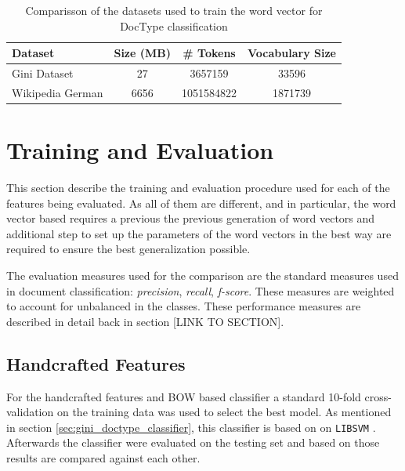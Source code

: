 \begin{table}[h]

  \centering
  \caption{Comparisson of the datasets used to train the word vector for
    \ac{DocType} classification}
  \label{tab:w2v4tc_dataset_comparisson}

\small
\begin{tabular}{|l|c|c|c|}
\hline
Dataset           &  Size (MB)  &    \# Tokens  &  Vocabulary  Size  \\
\hline
 Gini Dataset      &         27  &     3657159  &             33596  \\
 Wikipedia German  &       6656  &  1051584822  &           1871739  \\
\hline
\end{tabular}

\end{table}


\section{Training and Evaluation}
\label{sec:w2v4tc_training-evaluation}

This section describe the training and evaluation procedure used for each of
the features being evaluated. As all of them are different, and in
particular, the word vector based requires a previous the previous generation
of word vectors and additional step to set up the parameters of the word
vectors in the best way are required to ensure the best generalization
possible.

The evaluation measures used for the comparison  are the standard measures used in document
classification: \textit{precision}, \textit{recall}, \textit{f-score}. These
measures are  weighted to account for unbalanced in the classes. These
performance measures are described in detail back in section [LINK TO SECTION].


\subsection{Handcrafted Features}

For the handcrafted features and \ac{BOW} based classifier a standard 10-fold
cross-validation  on the training data  was used to select the best model.
As mentioned in section \ref{sec:gini_doctype_classifier}, this classifier is
based on  on \texttt{LIBSVM} \cite{CC01a}.
Afterwards the classifier were evaluated on the testing set and based on
those results are compared against each other.

